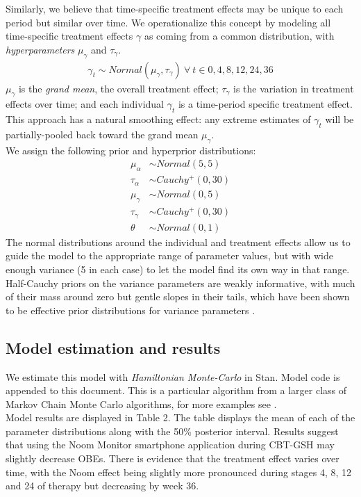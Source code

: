 \documentclass{article}
\begin{document}
%
Similarly, we believe that time-specific treatment effects may be unique to each period but similar over time. We operationalize this concept by modeling all time-specific treatment effects $\gamma$ as coming from a common distribution, with \emph{hyperparameters} $\mu_{\gamma}$ and $\tau_{\gamma}$.
%
\begin{align}
\gamma_t \sim Normal(\mu_{\gamma}, \tau_{\gamma}) \ \forall \ t \in 0, 4, 8, 12, 24, 36
\end{align} 
%
$\mu_{\gamma}$ is the \emph{grand mean}, the overall treatment effect; $\tau_{\gamma}$ is the variation in treatment effects over time; and each individual $\gamma_t$ is a time-period specific treatment effect.  This approach has a natural smoothing effect: any extreme estimates of $\gamma_t$ will be partially-pooled back toward the grand mean $\mu_{\gamma}$.\\
%
We assign the following prior and hyperprior distributions:
\begin{align}
\mu_{\alpha} &\sim Normal(5, 5) \\
\tau_{\alpha} &\sim Cauchy^+(0, 30) \\
\mu_{\gamma} &\sim Normal(0, 5) \\
\tau_{\gamma} &\sim Cauchy^+(0, 30) \\
\theta &\sim Normal(0, 1)
\end{align}
%
The normal distributions around the individual and treatment effects allow us to guide the model to the appropriate range of parameter values, but with wide enough variance (5 in each case) to let the model find its own way in that range.  Half-Cauchy priors on the variance parameters are weakly informative, with much of their mass around zero but gentle slopes in their tails, which have been shown to be effective prior distributions for variance parameters \cite{gelman2006prior}.

\subsection*{Model estimation and results}
We estimate this model with \emph{Hamiltonian Monte-Carlo} in Stan.  Model code is appended to this document. This is a particular algorithm from a larger class of Markov Chain Monte Carlo algorithms, for more examples see .\\
Model results are displayed in Table 2. The table displays the mean of each of the parameter distributions along with the 50\% posterior interval. Results suggest that using the Noom Monitor smartphone application during CBT-GSH may slightly decrease OBEs.  There is evidence that the treatment effect varies over time, with the Noom effect being slightly more pronounced during stages 4, 8, 12 and 24 of therapy but decreasing by week 36.
\end{document}
